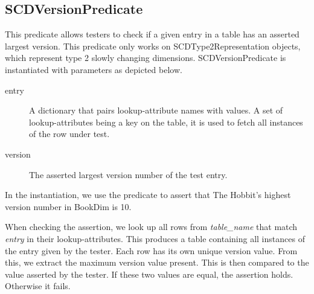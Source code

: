 \subsection{SCDVersionPredicate}\label{SCD}

This predicate allows testers to check if a given entry in a table has an asserted largest version. This predicate only works on SCDType2Representation objects, which represent type 2 slowly changing dimensions. SCDVersionPredicate is instantiated with parameters as depicted below.


\begin{description}
\item [entry] A dictionary that pairs lookup-attribute names with values. A set of lookup-attributes being a key on the table, it is used to fetch all instances of the row under test.  
\item [version] The asserted largest version number of the test entry.
\end{description}

In the instantiation, we use the predicate to assert that The Hobbit's highest version number in BookDim is 10.

When checking the assertion, we look up all rows from \textit{table\_name} that match \textit{entry} in their lookup-attributes. This produces a table containing all instances of the entry given by the tester. Each row has its own unique version value. From this, we extract the maximum version value present. This is then compared to the value asserted by the tester. If these two values are equal, the assertion holds. Otherwise it fails.
